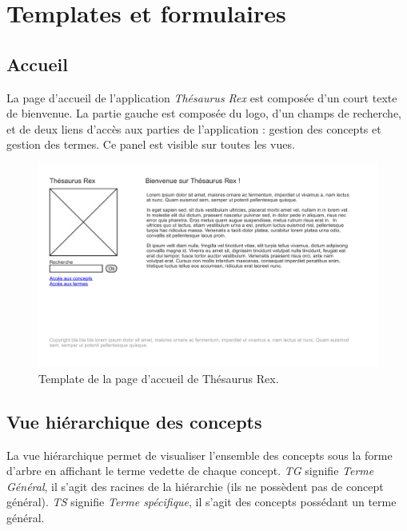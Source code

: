 	
\section{Templates et formulaires}

\subsection{Accueil}

La page d'accueil de l'application \emph{Thésaurus Rex} est composée d'un court texte de bienvenue. La partie gauche est composée du logo, d'un champs de recherche, et de deux liens d'accès aux parties de l'application : gestion des concepts et gestion des termes. Ce panel est visible sur toutes les vues.
\begin{figure}[H]
\begin{center}
\includegraphics[width=\textwidth]{files/template_accueil}
\end{center}
\caption{Template de la page d'accueil de Thésaurus Rex.}
\end{figure}

\subsection{Vue hiérarchique des concepts}

La vue hiérarchique permet de visualiser l'ensemble des concepts sous la forme d'arbre en affichant le terme vedette de chaque concept. \emph{TG} signifie \emph{Terme Général},  il s'agit des racines de la hiérarchie (ils ne possèdent pas de concept général). \emph{TS} signifie \emph{Terme spécifique}, il s'agit des concepts possédant un terme général.

